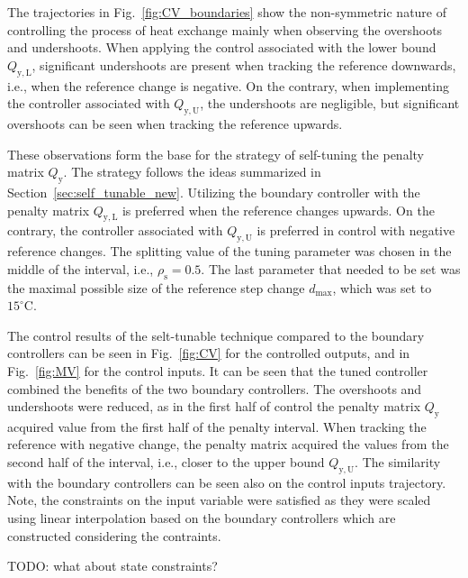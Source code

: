 \documentclass[preprint,12pt]{elsarticle}
\begin{document}
The trajectories in Fig.~\ref{fig:CV_boundaries} show the non-symmetric nature of controlling the process of heat exchange mainly when observing the overshoots and undershoots. When applying the control associated with the lower bound $Q_\mathrm{y, L}$, significant undershoots are present when tracking the reference downwards, i.e., when the reference change is negative. On the contrary, when implementing the controller associated with $Q_\mathrm{y, U}$, the undershoots are negligible, but significant overshoots can be seen when tracking the reference upwards.

These observations form the base for the strategy of self-tuning the penalty matrix $Q_\mathrm{y}$. The strategy follows the ideas summarized in Section~\ref{sec:self_tunable_new}. Utilizing the boundary controller with the penalty matrix $Q_\mathrm{y,L}$ is preferred when the reference changes upwards. On the contrary, the controller associated with $Q_\mathrm{y,U}$ is preferred in control with negative reference changes. The splitting value of the tuning parameter was chosen in the middle of the interval, i.e., $\rho_{\mathrm{s}} = 0.5$. The last parameter that needed to be set was the maximal possible size of the reference step change $d_{\max}$, which was set to $15^{\circ}\mathrm{C}$. 

The control results of the selt-tunable technique compared to the boundary controllers can be seen in Fig.~\ref{fig:CV} for the controlled outputs, and in Fig.~\ref{fig:MV} for the control inputs. It can be seen that the tuned controller combined the benefits of the two boundary controllers. The overshoots and undershoots were reduced, as in the first half of control the penalty matrix $Q_\mathrm{y}$ acquired value from the first half of the penalty interval. When tracking the reference with negative change, the penalty matrix acquired the values from the second half of the interval, i.e., closer to the upper bound $Q_\mathrm{y,U}$. 
The similarity with the boundary controllers can be seen also on the control inputs trajectory. Note, the constraints on the input variable were satisfied as they were scaled using linear interpolation based on the boundary controllers which are constructed considering the contraints. 

TODO: what about state constraints?
\end{document}

